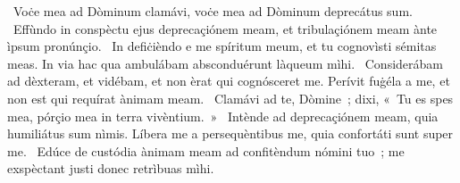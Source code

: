 \psalmChapterWithInscription{}
{ }
{%
~Voċe mea ad Dòminum clamávi, voċe mea ad Dòminum deprecátus sum. 
~Effùndo in conspèctu ejus deprecaçiónem meam, et tribulaçiónem meam ànte ìpsum pronúnçio. 
~In defiċièndo e me spíritum meum, et tu cognovìsti sémitas meas. In via hac qua ambulábam absconduérunt làqueum mìhi. 
~Considerábam ad dèxteram, et vidébam, et non èrat qui cognósceret me. Perívit fuġéla a me, et non est qui requírat ànimam meam. 
~Clamávi ad te, Dòmine~; dixi, «~Tu es spes mea, pórçio mea in terra vivèntium.~»
~Intènde ad deprecaçiónem meam, quia humiliátus sum nìmis. Líbera me a persequèntibus me, quia confortáti sunt super me. 
~Edúce de custódia ànimam meam ad confitèndum nómini tuo~; me exspèctant justi donec retrìbuas mìhi. 
}

